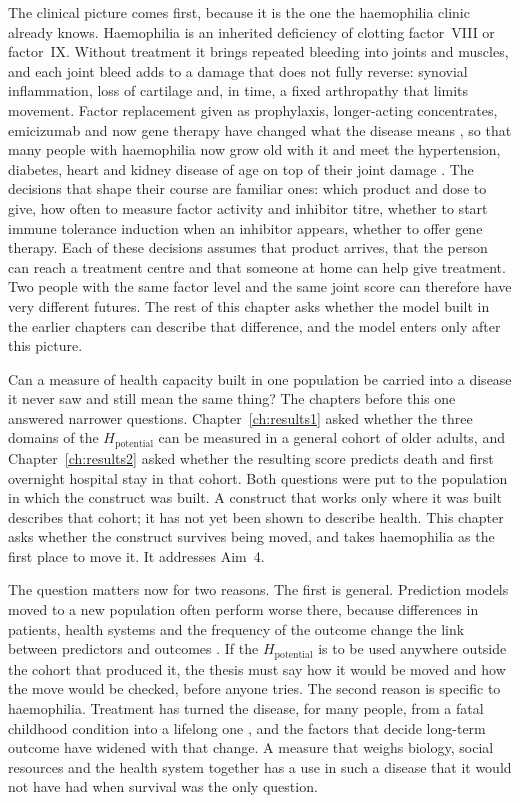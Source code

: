 \noindent The clinical picture comes first, because it is the one the haemophilia clinic already knows. Haemophilia is an inherited deficiency of clotting factor~VIII or factor~IX. Without treatment it brings repeated bleeding into joints and muscles, and each joint bleed adds to a damage that does not fully reverse: synovial inflammation, loss of cartilage and, in time, a fixed arthropathy that limits movement. Factor replacement given as prophylaxis, longer-acting concentrates, emicizumab and now gene therapy have changed what the disease means \citep{srivastava_2020}, so that many people with haemophilia now grow old with it and meet the hypertension, diabetes, heart and kidney disease of age on top of their joint damage \citep{mauser_2009}. The decisions that shape their course are familiar ones: which product and dose to give, how often to measure factor activity and inhibitor titre, whether to start immune tolerance induction when an inhibitor appears, whether to offer gene therapy. Each of these decisions assumes that product arrives, that the person can reach a treatment centre and that someone at home can help give treatment. Two people with the same factor level and the same joint score can therefore have very different futures. The rest of this chapter asks whether the model built in the earlier chapters can describe that difference, and the model enters only after this picture.

Can a measure of health capacity built in one population be carried into a disease it never saw and still mean the same thing? The chapters before this one answered narrower questions. Chapter~\ref{ch:results1} asked whether the three domains of the $H_{\text{potential}}$ can be measured in a general cohort of older adults, and Chapter~\ref{ch:results2} asked whether the resulting score predicts death and first overnight hospital stay in that cohort. Both questions were put to the population in which the construct was built. A construct that works only where it was built describes that cohort; it has not yet been shown to describe health. This chapter asks whether the construct survives being moved, and takes haemophilia as the first place to move it. It addresses Aim~4.

The question matters now for two reasons. The first is general. Prediction models moved to a new population often perform worse there, because differences in patients, health systems and the frequency of the outcome change the link between predictors and outcomes \citep{moons_2019,collins_2024}. If the $H_{\text{potential}}$ is to be used anywhere outside the cohort that produced it, the thesis must say how it would be moved and how the move would be checked, before anyone tries. The second reason is specific to haemophilia. Treatment has turned the disease, for many people, from a fatal childhood condition into a lifelong one \citep{srivastava_2020}, and the factors that decide long-term outcome have widened with that change. A measure that weighs biology, social resources and the health system together has a use in such a disease that it would not have had when survival was the only question.

